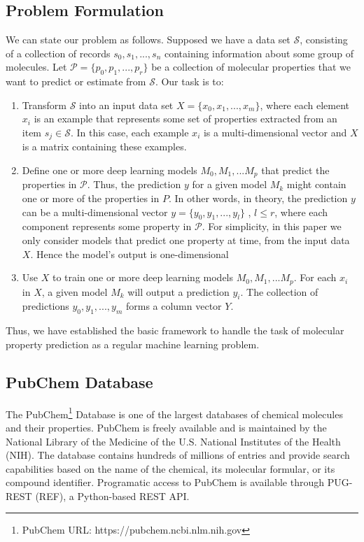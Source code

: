 \subsection{Problem Formulation}
We can state our problem as follows. Supposed we have a data set $\mathcal{S}$, consisting of a collection of records $s_0, s_1, ..., s_n$ containing information about some group of molecules. Let $\mathcal{P} = \{p_0, p_1, ..., p_r\}$ be a collection of molecular properties that we want to predict or estimate from $\mathcal{S}$.  Our task is to: 
\begin{enumerate}
	\item Transform $\mathcal{S}$ into an input data set $X = \{x_0, x_1, ..., x_m\}$, where each element $x_i$ is an example that represents 
	some set of properties extracted from an item $s_j \in  \mathcal{S}$. In this case, each example $x_i$ is a multi-dimensional vector and 
	$X$ is a matrix containing these examples.
	\item Define one or more deep learning models $M_0, M_1, ... M_p$ that predict the properties in $\mathcal{P}$. Thus, the prediction $y$ for a given model $M_k$ might contain one or more of the properties in $P$. In other words, in theory, the prediction $y$ can be a multi-dimensional vector $y = \{y_0, y_1, ..., y_l\}$ , $l \leq r$, where each component represents some property in $\mathcal{P}$. For simplicity, in this paper we only consider models that predict one property at time,  from the input data $X$. Hence the model's output is one-dimensional
	\item Use $X$ to train one or more deep learning models $M_0, M_1, ... M_p$. For each $x_i$ in $X$, a given model $M_k$ will output a prediction $y_i$. The collection of predictions $y_0, y_1, ..., y_m$ forms a column vector $Y$. 
\end{enumerate}
Thus, we have established the basic framework to handle the task of molecular property prediction as a regular machine learning problem. 
\subsection{PubChem Database}
The PubChem\footnote{PubChem URL: https://pubchem.ncbi.nlm.nih.gov} Database is one of the largest databases of chemical molecules and their properties. PubChem is freely available and is maintained by the National Library of the Medicine of the U.S. National Institutes of the Health (NIH). The database contains hundreds of millions of entries and provide search capabilities based on the name of the chemical, its molecular formular, or its compound identifier.  Programatic access to  PubChem is available through PUG-REST (REF), a Python-based REST API. 

